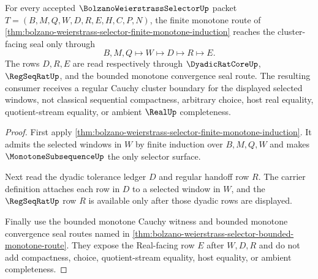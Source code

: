 \begin{theorem}
\label{thm:bolzano-weierstrass-selector-regular-cauchy-cluster-seal}
For every accepted $\BolzanoWeierstrassSelectorUp$ packet
$T=(B,M,Q,W,D,R,E,H,C,P,N)$, the finite monotone route of
\autoref{thm:bolzano-weierstrass-selector-finite-monotone-induction} reaches the
cluster-facing seal only through
$$
B,M,Q\longmapsto W\longmapsto D\longmapsto R\longmapsto E .
$$
The rows $D,R,E$ are read respectively through $\DyadicRatCoreUp$,
$\RegSeqRatUp$, and the bounded monotone convergence seal route. The resulting
consumer receives a regular Cauchy cluster boundary for the displayed selected
windows, not classical sequential compactness, arbitrary choice, host real
equality, quotient-stream equality, or ambient $\RealUp$ completeness.
\end{theorem}
\begin{proof}
First apply
\autoref{thm:bolzano-weierstrass-selector-finite-monotone-induction}. It admits
the selected windows in $W$ by finite induction over $B,M,Q,W$ and makes
$\MonotoneSubsequenceUp$ the only selector surface.

Next read the dyadic tolerance ledger $D$ and regular handoff row $R$. The
carrier definition attaches each row in $D$ to a selected window in $W$, and the
$\RegSeqRatUp$ row $R$ is available only after those dyadic rows are displayed.

Finally use the bounded monotone Cauchy witness and bounded monotone convergence
seal routes named in
\autoref{thm:bolzano-weierstrass-selector-bounded-monotone-route}. They expose
the Real-facing row $E$ after $W,D,R$ and do not add compactness, choice,
quotient-stream equality, host equality, or ambient completeness.
\end{proof}

